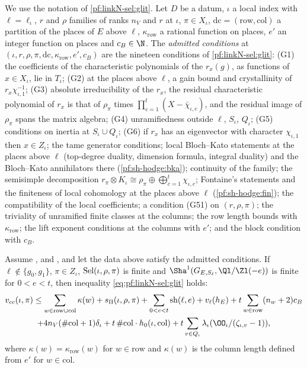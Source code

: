 We use the notation of \cref{pf:linkN-sel:glit}. Let $D$ be a datum, $\iota$ a local index with $\ell=\ell_\iota$, $r$ and $\rho$ families of ranks $n_V$ and
$r$ at $\iota$, $\pi\in X_\iota$, $\mathrm{dc}=(\mathrm{row},\mathrm{col})$ a partition of the places of $E$ above $\ell$, $\kappa_{\mathrm{row}}$ a rational
function on places, $e'$ an integer function on places and $c_B\in\N$. The \emph{admitted conditions} at $(\iota,r,\rho,\pi,\mathrm{dc},\kappa_{\mathrm{row}},e',c_B)$ are the nineteen conditions of \cref{pf:linkN-sel:glit}:
(G1) the coefficients of the characteristic polynomials of the $r_x(g)$, as functions of $x\in X_\iota$, lie in $T_\iota$; (G2) at the places above $\ell$, a
gain bound and crystallinity of $r_x\chi_{\iota,1}^{-1}$; (G3) absolute irreducibility of the $r_x$, the residual characteristic polynomial of $r_x$ is that
of $\rho_\pi$ times $\prod_{c=1}^t(X-\bar\chi_{\iota,c})$, and the residual image of $\rho_\pi$ spans the matrix algebra; (G4) unramifiedness outside $\ell$,
$S_\iota$, $Q_\iota$; (G5) conditions on inertia at $S_\iota\cup Q_\iota$; (G6) if $r_x$ has an eigenvector with character $\chi_{\iota,1}$ then $x\in Z_\iota$;
the tame generator conditions; local Bloch--Kato statements at the places above $\ell$ (top-degree duality, dimension formula, integral duality) and the
Bloch--Kato annihilators there (\cref{pf:sh-hodge:bka}); continuity of the family; the semisimple decomposition $r_\pi\otimes K_\iota\cong\rho_\pi\oplus
\bigoplus_{c=1}^t\chi_{\iota,c}$; Fontaine's statements and the finiteness of local cohomology at the places above $\ell$ (\cref{pf:sh-hodge:fin}); the
compatibility of the local coefficients; a condition (G51) on $(r,\rho,\pi)$; the triviality of unramified finite classes at the columns; the row length bounds
with $\kappa_{\mathrm{row}}$; the lift exponent conditions at the columns with $e'$; and the block condition with $c_B$.

\begin{theorem}\label{pf:sh-hodge:glit}
Assume \shhodgeGAR, \shhodgeLTD{} and \shhodgeLEC, and let the data above satisfy the admitted conditions. If $\ell\notin\{g_0,g_1\}$, $\pi\in Z_\iota$,
$\operatorname{Sel}(\iota,\rho,\pi)$ is finite and $\Sha^1(G_{E,S_\ell},\Ql/\Zl(-e))$ is finite for $0<e<t$, then inequality \eqref{eq:pf:linkN-sel:glit}
holds:
\begin{multline*}
v_{cc}(\iota,\pi)\le\sum_{w\in\mathrm{row}\cup\mathrm{col}}\kappa(w)+s_\Pi(\iota,\rho,\pi)+\sum_{0<e<t}\mathrm{sh}(\ell,e)+v_\ell(h_E)
+t\sum_{w\in\mathrm{row}}(n_w+2)c_B\\
+4n_V(\#\mathrm{col}+1)\delta_\iota+t\,\#\mathrm{col}\cdot h_0(\iota,\mathrm{col})+t\sum_{v\in Q_\iota}\lambda_\iota(\OO_\iota/(\zeta_{\iota,v}-1)),
\end{multline*}
where $\kappa(w)=\kappa_{\mathrm{row}}(w)$ for $w\in\mathrm{row}$ and $\kappa(w)$ is the column length defined from $e'$ for $w\in\mathrm{col}$.
\end{theorem}

